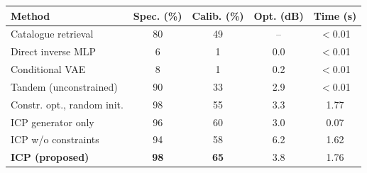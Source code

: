 \begin{tabular}{lcccc}
\toprule
Method & Spec. (\%) & Calib. (\%) & Opt. (dB) & Time (s) \\
\midrule
Catalogue retrieval & 80 & 49 & -- & $<$0.01 \\
Direct inverse MLP & 6 & 1 & 0.0 & $<$0.01 \\
Conditional VAE & 8 & 1 & 0.2 & $<$0.01 \\
Tandem (unconstrained) & 90 & 33 & 2.9 & $<$0.01 \\
Constr. opt., random init. & 98 & 55 & 3.3 & 1.77 \\
ICP generator only & 96 & 60 & 3.0 & 0.07 \\
ICP w/o constraints & 94 & 58 & 6.2 & 1.62 \\
\textbf{ICP (proposed)} & \textbf{98} & \textbf{65} & 3.8 & 1.76 \\
\bottomrule
\end{tabular}
